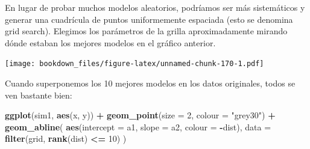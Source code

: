 \documentclass[]{book}
\newenvironment{Shaded}{\begin{snugshade}}{\end{snugshade}}
\newcommand{\DataTypeTok}[1]{\textcolor[rgb]{0.13,0.29,0.53}{#1}}
\newcommand{\DecValTok}[1]{\textcolor[rgb]{0.00,0.00,0.81}{#1}}
\newcommand{\KeywordTok}[1]{\textcolor[rgb]{0.13,0.29,0.53}{\textbf{#1}}}
\newcommand{\NormalTok}[1]{#1}
\newcommand{\OperatorTok}[1]{\textcolor[rgb]{0.81,0.36,0.00}{\textbf{#1}}}
\newcommand{\StringTok}[1]{\textcolor[rgb]{0.31,0.60,0.02}{#1}}
\begin{document}
En lugar de probar muchos modelos aleatorios, podríamos ser más sistemáticos y generar una cuadrícula de puntos uniformemente espaciada (esto se denomina grid search). Elegimos los parámetros de la grilla aproximadamente mirando dónde estaban los mejores modelos en el gráfico anterior.

\begin{Shaded}
\end{Shaded}

\texttt{[image: bookdown\_files/figure-latex/unnamed-chunk-170-1.pdf]}

Cuando superponemos los 10 mejores modelos en los datos originales, todos se ven bastante bien:

\begin{Shaded}
\begin{Highlighting}[]
\KeywordTok{ggplot}\NormalTok{(sim1, }\KeywordTok{aes}\NormalTok{(x, y)) }\OperatorTok{+}\StringTok{ }
\StringTok{  }\KeywordTok{geom_point}\NormalTok{(}\DataTypeTok{size =} \DecValTok{2}\NormalTok{, }\DataTypeTok{colour =} \StringTok{"grey30"}\NormalTok{) }\OperatorTok{+}\StringTok{ }
\StringTok{  }\KeywordTok{geom_abline}\NormalTok{(}
    \KeywordTok{aes}\NormalTok{(}\DataTypeTok{intercept =}\NormalTok{ a1, }\DataTypeTok{slope =}\NormalTok{ a2, }\DataTypeTok{colour =} \OperatorTok{-}\NormalTok{dist), }
    \DataTypeTok{data =} \KeywordTok{filter}\NormalTok{(grid, }\KeywordTok{rank}\NormalTok{(dist) }\OperatorTok{<=}\StringTok{ }\DecValTok{10}\NormalTok{)}
\NormalTok{  )}
\end{Highlighting}
\end{Shaded}
\end{document}

